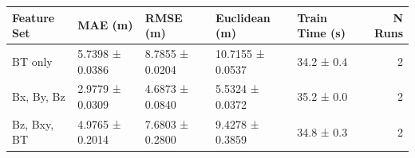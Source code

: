 \begin{tabular}{lllllr}
\toprule
Feature Set & MAE (m) & RMSE (m) & Euclidean (m) & Train Time (s) & N Runs \\
\midrule
BT only & 5.7398 ± 0.0386 & 8.7855 ± 0.0204 & 10.7155 ± 0.0537 & 34.2 ± 0.4 & 2 \\
Bx, By, Bz & 2.9779 ± 0.0309 & 4.6873 ± 0.0840 & 5.5324 ± 0.0372 & 35.2 ± 0.0 & 2 \\
Bz, Bxy, BT & 4.9765 ± 0.2014 & 7.6803 ± 0.2800 & 9.4278 ± 0.3859 & 34.8 ± 0.3 & 2 \\
\bottomrule
\end{tabular}
